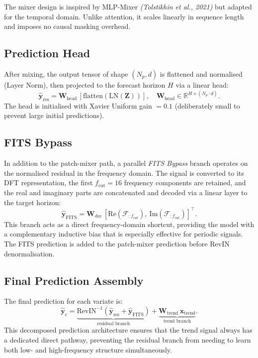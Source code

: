 \documentclass[11pt, letterpaper]{article}
\begin{document}
The mixer design is inspired by MLP-Mixer \textit{(Tolstikhin et al., 2021)} but adapted for the temporal domain. Unlike attention, it scales linearly in sequence length and imposes no causal masking overhead.

\subsection{Prediction Head}
\label{sec:head}

After mixing, the output tensor of shape $(N_p, d)$ is flattened and normalised (Layer Norm), then projected to the forecast horizon $H$ via a linear head:
\[
  \hat{\mathbf{y}}_\text{res} = \mathbf{W}_\text{head}\,[\text{flatten}(\text{LN}(\mathbf{Z}))],
  \quad \mathbf{W}_\text{head} \in \mathbb{R}^{H \times (N_p \cdot d)}.
\]
The head is initialised with Xavier Uniform gain $= 0.1$ (deliberately small to prevent large initial predictions).

\subsection{FITS Bypass}
\label{sec:fits}

In addition to the patch-mixer path, a parallel \textit{FITS Bypass} branch operates on the normalised residual in the frequency domain. The signal is converted to its DFT representation, the first $f_\text{cut} = 16$ frequency components are retained, and the real and imaginary parts are concatenated and decoded via a linear layer to the target horizon:
\[
  \hat{\mathbf{y}}_\text{FITS} = \mathbf{W}_\text{dec}\,[\text{Re}(\mathcal{F}_{:f_\text{cut}}),\ \text{Im}(\mathcal{F}_{:f_\text{cut}})]^\top.
\]
This branch acts as a direct frequency-domain shortcut, providing the model with a complementary inductive bias that is especially effective for periodic signals. The FITS prediction is added to the patch-mixer prediction before RevIN denormalisation.

\subsection{Final Prediction Assembly}
\label{sec:assembly}

The final prediction for each variate is:
\[
  \hat{\mathbf{y}}_c = \underbrace{\text{RevIN}^{-1}\!\left(\hat{\mathbf{y}}_\text{res} + \hat{\mathbf{y}}_\text{FITS}\right)}_{\text{residual branch}} + \underbrace{\mathbf{W}_\text{trend}\,\mathbf{x}_\text{trend}}_{\text{trend branch}}.
\]
This decomposed prediction architecture ensures that the trend signal always has a dedicated direct pathway, preventing the residual branch from needing to learn both low- and high-frequency structure simultaneously.
\end{document}
